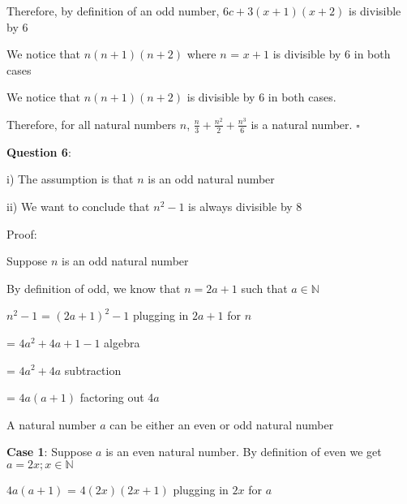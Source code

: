 \documentclass{article} %
\newcommand{\question}[2][]{\begin{flushleft}
        \textbf{Question #1}: \textit{#2}

\end{flushleft}}
\begin{document}

    \tabto*{2cm} Therefore, by definition of an odd number, $6c + 3(x+1)(x+2)$ is divisible by 6

    \tabto*{1cm}We notice that $n(n + 1)(n + 2)$ where $n$ = $x + 1$ is divisible by 6 in both cases

    We notice that $n(n + 1)(n + 2)$ is divisible by 6 in both cases.

    \vspace*{0.2cm}

    Therefore, for all natural numbers $n$, $\frac{n}{3} + \frac{n^2}{2} + \frac{n^3}{6}$ is a natural number. $\square$


    \question[6]{}

    i) The assumption is that $n$ is an odd natural number

    ii) We want to conclude that $n^2 -1$ is always divisible by 8

    Proof:

    Suppose $n$ is an odd natural number
    
    By definition of odd, we know that $n = 2a+1$ such that $a \in \mathbb{N}$

    $n^2-1$ = $(2a+1)^2-1$ \tabto*{5cm}plugging in $2a + 1$ for $n$

    \tabto*{1.64cm} = $4a^2 + 4a + 1 -1$ \tabto*{5cm}algebra

    \tabto*{1.64cm} = $4a^2 + 4a$ \tabto*{5cm}subtraction

    \tabto*{1.64cm} = $4a(a + 1)$ \tabto*{5cm}factoring out 4$a$

    A natural number $a$ can be either an even or odd natural number 

    \vspace*{0.2cm}

    \textbf{Case 1}: Suppose $a$ is an even natural number. By definition of even we get $a = 2x; x \in \mathbb{N}$

    $4a(a + 1)$ = $4(2x)(2x + 1)$ \tabto*{5cm}plugging in $2x$ for $a$
\end{document}

